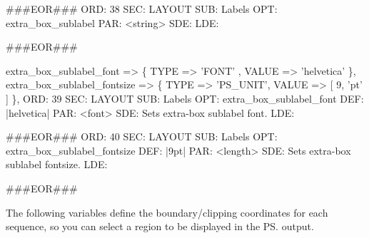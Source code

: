 \documentclass[11pt]{article}
\def\nwendcode{\endtrivlist \endgroup} %
\let\nwdocspar=\par                    %
\begin{document}
###EOR###
ORD: 38
SEC: LAYOUT
SUB: Labels
OPT: extra_box_sublabel
PAR: <string>
SDE: 
LDE:

###EOR###
\nwendcode{}\nwdocspar
\nwenddocs{}\plusendmoddef
extra_box_sublabel_font     => \{ TYPE => 'FONT'   , VALUE => 'helvetica'  \},
extra_box_sublabel_fontsize => \{ TYPE => 'PS_UNIT', VALUE => [ 9, 'pt' ]  \},
\eatline
{}\nwendcode{}\plusendmoddef
ORD: 39
SEC: LAYOUT
SUB: Labels
OPT: extra_box_sublabel_font
DEF: |helvetica|
PAR: <font>
SDE: Sets extra-box sublabel font.
LDE:

###EOR###
ORD: 40
SEC: LAYOUT
SUB: Labels
OPT: extra_box_sublabel_fontsize
DEF: |9pt|
PAR: <length>
SDE: Sets extra-box sublabel fontsize.
LDE:

###EOR###
\nwendcode{}\nwdocspar



The following variables define the boundary/clipping coordinates for each sequence, so you can select a region to be displayed in the {\ps} output.
\end{document}
